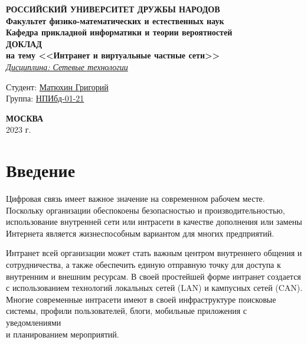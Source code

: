 \documentclass[a4page]{article}
\begin{document}
\begin{titlepage}

	\begin{center}
		\hfill \break
		\textbf{
			\large{РОССИЙСКИЙ УНИВЕРСИТЕТ ДРУЖБЫ НАРОДОВ}\\
			\normalsize{Факультет физико-математических и естественных наук}\\
			\normalsize{Кафедра прикладной информатики и теории вероятностей}\\
		}
		\vspace*{\fill}
		\Large{\textbf{ДОКЛАД\\ на тему <<Интранет и виртуальные частные сети>>}}
		\\
		\underline{\textit{\normalsize{Дисциплина: Сетевые технологии}}}
		\vspace*{\fill}

	\end{center}

	\begin{flushright}
		Студент: \underline{Матюхин Григорий}\\ \vspace{0.5cm}
		Группа: \underline{НПИбд-01-21}
	\end{flushright}


	\begin{center} \textbf{МОСКВА} \\ 2023 г. \end{center}
	\thispagestyle{empty} %

\end{titlepage}

\newpage

\tableofcontents

\newpage
\section{Введение}
Цифровая связь имеет важное значение на современном рабочем месте. Поскольку организации обеспокоены безопасностью и производительностью, использование внутренней сети или интрасети в качестве дополнения или замены Интернета является жизнеспособным вариантом для многих предприятий.

Интранет всей организации может стать важным центром внутреннего общения и сотрудничества, а также обеспечить единую отправную точку для доступа к внутренним и внешним ресурсам. В своей простейшей форме интранет создается с использованием технологий локальных сетей (LAN) и кампусных сетей (CAN).\cite{rfc4364} Многие современные интрасети имеют в своей инфраструктуре поисковые системы, профили пользователей, блоги, мобильные приложения с уведомлениями\\ и планированием мероприятий.
\end{document}
